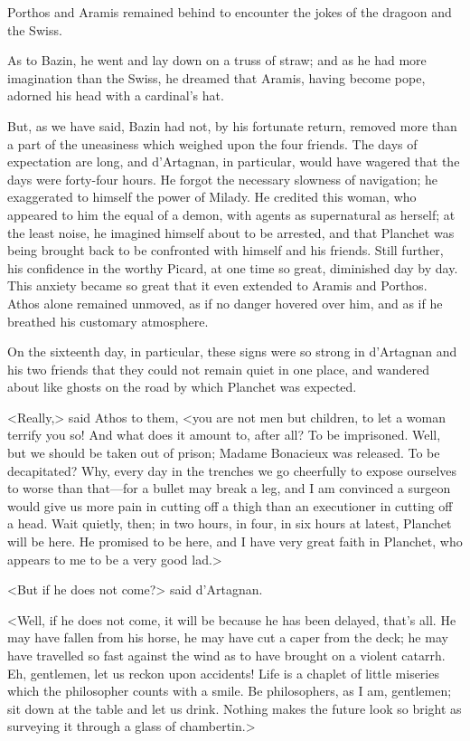 Porthos and Aramis remained behind to encounter the jokes of the dragoon and the Swiss. 

As to Bazin, he went and lay down on a truss of straw; and as he had more imagination than the Swiss, he dreamed that Aramis, having become pope, adorned his head with a cardinal's hat. 

But, as we have said, Bazin had not, by his fortunate return, removed more than a part of the uneasiness which weighed upon the four friends. The days of expectation are long, and d'Artagnan, in particular, would have wagered that the days were forty-four hours. He forgot the necessary slowness of navigation; he exaggerated to himself the power of Milady. He credited this woman, who appeared to him the equal of a demon, with agents as supernatural as herself; at the least noise, he imagined himself about to be arrested, and that Planchet was being brought back to be confronted with himself and his friends. Still further, his confidence in the worthy Picard, at one time so great, diminished day by day. This anxiety became so great that it even extended to Aramis and Porthos. Athos alone remained unmoved, as if no danger hovered over him, and as if he breathed his customary atmosphere. 

On the sixteenth day, in particular, these signs were so strong in d'Artagnan and his two friends that they could not remain quiet in one place, and wandered about like ghosts on the road by which Planchet was expected. 

<Really,> said Athos to them, <you are not men but children, to let a woman terrify you so! And what does it amount to, after all? To be imprisoned. Well, but we should be taken out of prison; Madame Bonacieux was released. To be decapitated? Why, every day in the trenches we go cheerfully to expose ourselves to worse than that---for a bullet may break a leg, and I am convinced a surgeon would give us more pain in cutting off a thigh than an executioner in cutting off a head. Wait quietly, then; in two hours, in four, in six hours at latest, Planchet will be here. He promised to be here, and I have very great faith in Planchet, who appears to me to be a very good lad.> 

<But if he does not come?> said d'Artagnan. 

<Well, if he does not come, it will be because he has been delayed, that's all. He may have fallen from his horse, he may have cut a caper from the deck; he may have travelled so fast against the wind as to have brought on a violent catarrh. Eh, gentlemen, let us reckon upon accidents! Life is a chaplet of little miseries which the philosopher counts with a smile. Be philosophers, as I am, gentlemen; sit down at the table and let us drink. Nothing makes the future look so bright as surveying it through a glass of chambertin.> 

